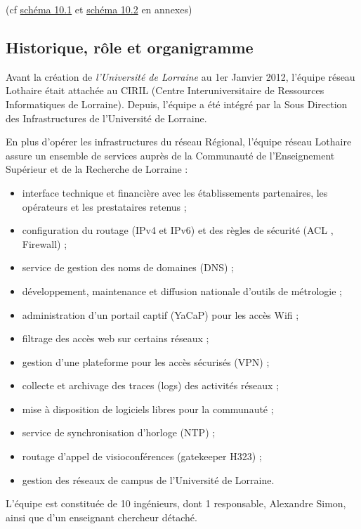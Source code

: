 \documentclass[a4paper,12pt,one side,titlepage]{report}
\begin{document}
(cf \hyperref[fig:imagereseaulothaire1]{schéma 10.1}  et \hyperref[fig:imagereseaulothaire1]{schéma 10.2} 
en annexes)

\subsection{Historique, rôle et organigramme}

Avant la création de \emph{l'Université de Lorraine} au 1er Janvier 2012, l'équipe
réseau Lothaire était attachée au CIRIL (Centre Interuniversitaire de Ressources Informatiques
de Lorraine). Depuis, l'équipe a été intégré par la Sous Direction des Infrastructures
de l'Université de Lorraine.

En plus d’opérer les infrastructures du réseau Régional, l’équipe réseau Lothaire 
assure un ensemble de services auprès de la Communauté de l’Enseignement Supérieur 
et de la Recherche de Lorraine :

\begin{itemize}
    \item interface technique et financière avec les établissements partenaires, 
    les opérateurs et les prestataires retenus ;
    \item configuration du routage (IPv4 et IPv6) et des règles de sécurité (ACL , 
    Firewall) ;
    \item service de gestion des noms de domaines (DNS) ;
    \item développement, maintenance et diffusion nationale d’outils de métrologie  ;
    \item administration d’un portail captif (YaCaP) pour les accès Wifi ;
    \item filtrage des accès web sur certains réseaux ;
    \item gestion d’une plateforme pour les accès sécurisés (VPN) ;
    \item collecte et archivage des traces (logs) des activités réseaux ;
    \item mise à disposition de logiciels libres pour la communauté ;
    \item service de synchronisation d’horloge (NTP) ;
    \item routage d’appel de visioconférences (gatekeeper H323) ;
    \item gestion des réseaux de campus de l’Université de Lorraine.
\end{itemize}                                                

L'équipe est constituée de 10 ingénieurs, dont 1 responsable, Alexandre Simon, ainsi
que d'un enseignant chercheur détaché.
\end{document}
